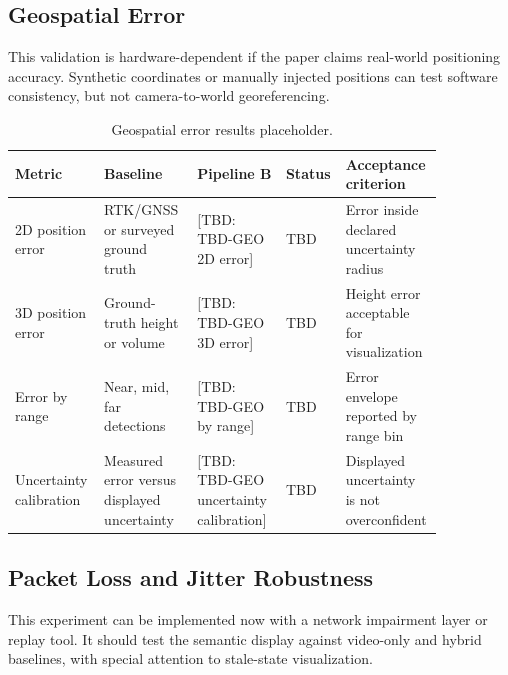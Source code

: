 \documentclass[11pt,a4paper]{article}
\newcommand{\tbd}[1]{\textcolor{publicationred}{[TBD: #1]}}
\begin{document}
\subsection{Geospatial Error}

This validation is hardware-dependent if the paper claims real-world positioning accuracy. Synthetic coordinates or manually injected positions can test software consistency, but not camera-to-world georeferencing.

\begin{table}[H]
\centering
\small
\caption{Geospatial error results placeholder.}
\label{tab:geo-placeholder}
\begin{tabular}{@{}L{0.18\linewidth}L{0.21\linewidth}L{0.20\linewidth}L{0.08\linewidth}L{0.18\linewidth}@{}}
\toprule
Metric & Baseline & Pipeline B & Status & Acceptance criterion \\
\midrule
2D position error & RTK/GNSS or surveyed ground truth & \tbd{TBD-GEO 2D error} & TBD & Error inside declared uncertainty radius \\
3D position error & Ground-truth height or volume & \tbd{TBD-GEO 3D error} & TBD & Height error acceptable for visualization \\
Error by range & Near, mid, far detections & \tbd{TBD-GEO by range} & TBD & Error envelope reported by range bin \\
Uncertainty calibration & Measured error versus displayed uncertainty & \tbd{TBD-GEO uncertainty calibration} & TBD & Displayed uncertainty is not overconfident \\
\bottomrule
\end{tabular}
\normalsize
\end{table}

\subsection{Packet Loss and Jitter Robustness}

This experiment can be implemented now with a network impairment layer or replay tool. It should test the semantic display against video-only and hybrid baselines, with special attention to stale-state visualization.
\end{document}
